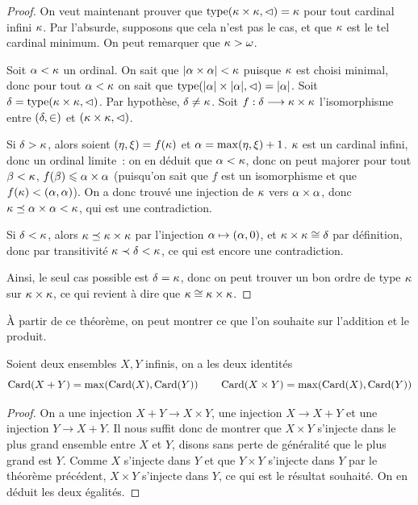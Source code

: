\begin{proof}
  On veut maintenant prouver que
  $\operatorname{type}(\kappa\times\kappa,\mathord{\mathrel{\lhd}}) = \kappa$
  pour tout cardinal infini $\kappa$. Par l'absurde, supposons que cela n'est
  pas le cas, et que $\kappa$ est le tel cardinal minimum. On peut remarquer que
  $\kappa > \omega$.

  Soit $\alpha < \kappa$ un ordinal. On sait que
  $|\alpha \times \alpha| < \kappa$ puisque $\kappa$ est choisi minimal, donc
  pour tout $\alpha < \kappa$ on sait que
  $\operatorname{type}(|\alpha| \times |\alpha|,\mathord{\mathrel{\lhd}}) = |\alpha|$. Soit
  $\delta = \operatorname{type}(\kappa\times\kappa,\mathord{\mathrel{\lhd}})$. Par hypothèse,
  $\delta \neq \kappa$. Soit $f : \displaystyle \delta \longrightarrow \kappa \times \kappa$
  l'isomorphisme entre $(\delta,\in)$ et
  $(\kappa\times\kappa,\mathord{\mathrel{\lhd}})$.

  Si $\delta > \kappa$, alors soient $(\eta,\xi) = f(\kappa)$ et
  $\alpha = \max(\eta,\xi) + 1$. $\kappa$ est un cardinal infini, donc un
  ordinal limite~: on en déduit que $\alpha < \kappa$, donc on peut majorer pour
  tout $\beta < \kappa$, $f(\beta) \leqslant \alpha \times \alpha$ (puisqu'on sait
  que $f$ est un isomorphisme et que $f(\kappa) < (\alpha,\alpha)$). On a donc
  trouvé une injection de $\kappa$ vers $\alpha \times \alpha$, donc
  $\kappa \preceq \alpha\times \alpha < \kappa$, qui est une contradiction.

  Si $\delta < \kappa$, alors $\kappa \preceq \kappa \times \kappa$ par
  l'injection $\alpha \mapsto (\alpha, 0)$, et $\kappa\times\kappa \cong \delta$
  par définition, donc par transitivité $\kappa \prec \delta < \kappa$, ce
  qui est encore une contradiction.

  Ainsi, le seul cas possible est $\delta = \kappa$, donc on peut trouver un
  bon ordre de type $\kappa$ sur $\kappa\times\kappa$, ce qui revient à dire que
  $\kappa \cong \kappa\times\kappa$.
\end{proof}

\noindent
\`A partir de ce théorème, on peut montrer ce que l'on souhaite sur l'addition
et le produit.

\begin{proposition}
  Soient deux ensembles $X,Y$ infinis, on a les deux identités
  \[\operatorname{Card}(X+Y) = \max(\operatorname{Card}(X),\operatorname{Card}(Y))\qquad
  \operatorname{Card}(X\times Y) = \max(\operatorname{Card}(X),\operatorname{Card}(Y))\]
\end{proposition}

\begin{proof}
  On a une injection $X+Y\to X\times Y$, une injection $X\to X + Y$ et une
  injection $Y\to X + Y$. Il nous suffit donc de montrer que
  $X\times Y$ s'injecte dans le plus grand ensemble entre $X$ et $Y$, disons
  sans perte de généralité que le plus grand est $Y$. Comme $X$ s'injecte dans
  $Y$ et que $Y\times Y$ s'injecte dans $Y$ par le théorème précédent,
  $X\times Y$ s'injecte dans $Y$, ce qui est le résultat souhaité. On en déduit
  les deux égalités.
\end{proof}


